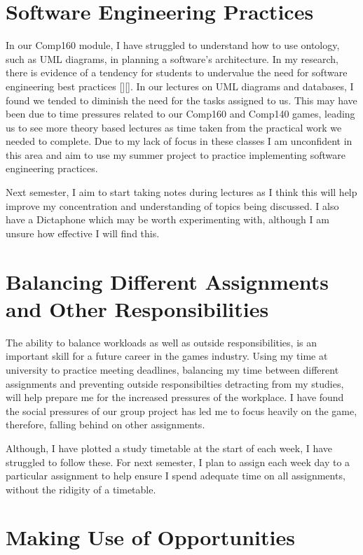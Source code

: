 \documentclass{scrartcl}
\begin{document}
\section{Software Engineering Practices}

In our Comp160 module, I have struggled to understand how to use ontology, such as UML diagrams, in planning a software's architecture. In my research, there is evidence of a tendency for students to undervalue the need for software engineering best practices [][]. In our lectures on UML diagrams and databases, I found we tended to diminish the need for the tasks assigned to us. This may have been due to time pressures related to our Comp160 and Comp140 games, leading us to see more theory based lectures as time taken from the practical work we needed to complete. Due to my lack of focus in these classes I am unconfident in this area and aim to use my summer project to practice implementing software engineering practices. 

Next semester, I aim to start taking notes during lectures as I think this will help improve my concentration and understanding of topics being discussed. I also have a Dictaphone which may be worth experimenting with, although I am unsure how effective I will find this.

\section{Balancing Different Assignments and Other Responsibilities}

The ability to balance workloads as well as outside responsibilities, is an important skill for a future career in the games industry. Using my time at university to practice meeting deadlines, balancing my time between different assignments and preventing outside responsibilties detracting from my studies, will help prepare me for the increased pressures of the workplace. I have found the social pressures of our group project has led me to focus heavily on the game, therefore, falling behind on other assignments. 

Although, I have plotted a study timetable at the start of each week, I have struggled to follow these. For next semester, I plan to assign each week day to a particular assignment to help ensure I spend adequate time on all assignments, without the ridigity of a timetable.

\section{Making Use of Opportunities}
\end{document}
